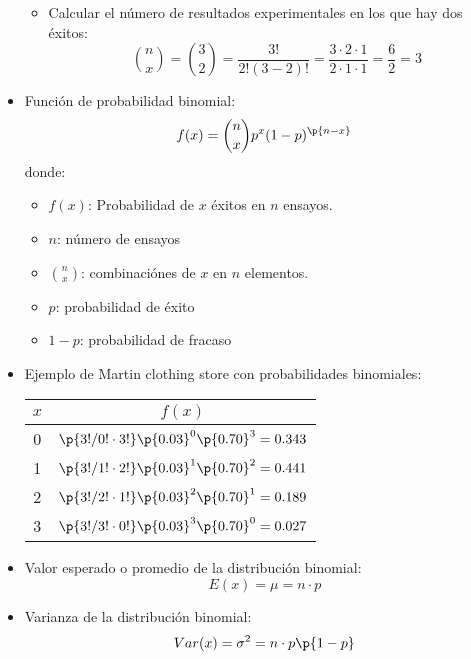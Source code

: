 \documentclass{article}
\begin{document}
\begin{itemize}
\begin{itemize}
            \item Calcular el número de resultados experimentales en los que hay dos éxitos:
                \[
                  \binom{n}{x} = \binom{3}{2} = \frac{3!}{2!(3-2)!} = \frac{3\cdot 2\cdot 1}{2\cdot 1 \cdot 1} = \frac{6}{2} = 3 
                \]            
        \end{itemize}
    
    \item Función de probabilidad binomial:
        \[
          f(x) = \binom{n}{x}p^x(1-p)^{\p{n-x}}
        \] donde:
        \begin{itemize}
            \item $f(x)$: Probabilidad de $x$ éxitos en $n$ ensayos.
            \item $n$: número de ensayos 
            \item $\binom{n}{x}$: combinaciónes de $x$ en $n$ elementos. 
            \item $p$: probabilidad de éxito 
            \item $1-p$: probabilidad de fracaso 
        \end{itemize}
    
    \item Ejemplo de Martin clothing store con probabilidades binomiales:
        \begin{center}
            \begin{tabular}{ |c|c| }
                \hline
                    $x$ & $f(x)$  \\
                \hline
                    0 & $\p{3!/0!\cdot 3!}\p{0.03}^0\p{0.70}^3 = 0.343 $ \\ 
                    1 & $\p{3!/1!\cdot 2!}\p{0.03}^1\p{0.70}^2 = 0.441 $ \\ 
                    2 & $\p{3!/2!\cdot 1!}\p{0.03}^2\p{0.70}^1 = 0.189 $ \\ 
                    3 & $\p{3!/3!\cdot 0!}\p{0.03}^3\p{0.70}^0 = 0.027 $ \\ 
                \hline
            \end{tabular}
        \end{center}
    
    \item Valor esperado o promedio de la distribución binomial:
        \[
          E(x) = \mu = n \cdot p 
        \]
    
    \item Varianza de la distribución binomial:
        \[
          Var(x) = \sigma^2 = n\cdot p \p{1-p} 
        \]
    
\end{itemize}
\end{document}
